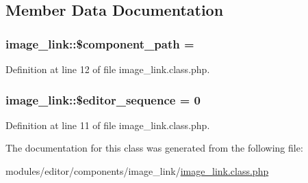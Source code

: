 \subsection{Member Data Documentation}
\subsubsection[{\texorpdfstring{\$component\+\_\+path}{$component_path}}]{\setlength{\rightskip}{0pt plus 5cm}image\+\_\+link\+::\$component\+\_\+path = \textquotesingle{}\textquotesingle{}}\hypertarget{classimage__link_ae68f572cbf4ce0aaa8ac20dd6b98a2f0}{}\label{classimage__link_ae68f572cbf4ce0aaa8ac20dd6b98a2f0}


Definition at line 12 of file image\+\_\+link.\+class.\+php.

\subsubsection[{\texorpdfstring{\$editor\+\_\+sequence}{$editor_sequence}}]{\setlength{\rightskip}{0pt plus 5cm}image\+\_\+link\+::\$editor\+\_\+sequence = 0}\hypertarget{classimage__link_af783692826f89b17fa6e9cf21d4f0f8b}{}\label{classimage__link_af783692826f89b17fa6e9cf21d4f0f8b}


Definition at line 11 of file image\+\_\+link.\+class.\+php.



The documentation for this class was generated from the following file\+:\begin{DoxyCompactItemize}
\item 
modules/editor/components/image\+\_\+link/\hyperlink{image__link_8class_8php}{image\+\_\+link.\+class.\+php}\end{DoxyCompactItemize}

